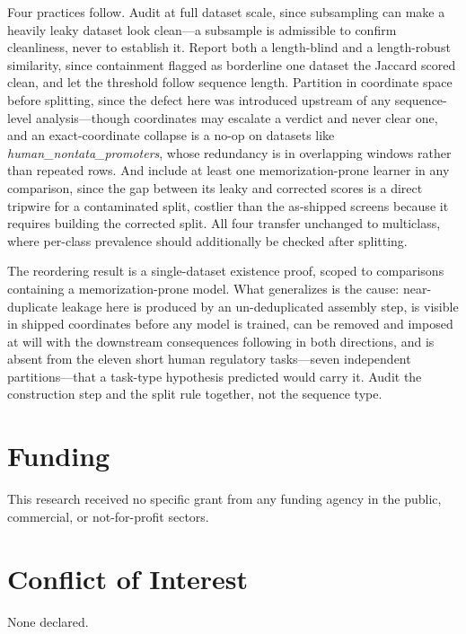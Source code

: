 \documentclass[webpdf,modern,large,namedate]{oup-authoring-template}%
\begin{document}
Four practices follow.\label{sec:practices} Audit at full dataset scale, since subsampling can make a heavily leaky dataset look clean---a subsample is admissible to confirm cleanliness, never to establish it. Report both a length-blind and a length-robust similarity, since containment flagged as borderline one dataset the Jaccard scored clean, and let the threshold follow sequence length. Partition in coordinate space before splitting, since the defect here was introduced upstream of any sequence-level analysis---though coordinates may escalate a verdict and never clear one, and an exact-coordinate collapse is a no-op on datasets like \textit{human\_nontata\_promoters}, whose redundancy is in overlapping windows rather than repeated rows. And include at least one memorization-prone learner in any comparison, since the gap between its leaky and corrected scores is a direct tripwire for a contaminated split, costlier than the as-shipped screens because it requires building the corrected split. All four transfer unchanged to multiclass, where per-class prevalence should additionally be checked after splitting.

The reordering result is a single-dataset existence proof, scoped to comparisons containing a memorization-prone model. What generalizes is the cause: near-duplicate leakage here is produced by an un-deduplicated assembly step, is visible in shipped coordinates before any model is trained, can be removed and imposed at will with the downstream consequences following in both directions, and is absent from the eleven short human regulatory tasks---seven independent partitions---that a task-type hypothesis predicted would carry it. Audit the construction step and the split rule together, not the sequence type.

\section*{Funding}
This research received no specific grant from any funding agency in the public, commercial, or not-for-profit sectors.

\section*{Conflict of Interest}
None declared.
\end{document}
